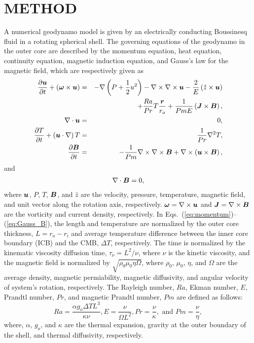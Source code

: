 \section{METHOD}

A numerical geodynamo model is given by an electrically conducting Boussinesq fluid in a rotating spherical shell. The governing equations of the geodynamo in the outer core are described by the momentum equation, heat equation, continuity equation, magnetic induction equation, and Gauss's law for the magnetic field, which are respectively given as
%
\begin{eqnarray}
\frac{\partial \bvec{u}}{\partial t} + \left(\bvec{\omega} \times \bvec{u}\right)
 & = & - \nabla \left(P+\frac{1}{2}u^{2} \right) - \nabla \times \nabla \times \bvec{u}
      - \frac{2}{E} \left(\hat{z} \times \bvec{u} \right)
\nonumber \\
 & & + \frac{Ra}{Pr} T \frac{\bvec{r}}{r_{o}}
        + \frac{1}{Pm E} \left(\bvec{J} \times \bvec{B} \right),
\label{eq:momentum} \\
%
\nabla \cdot \bvec{u} & = & 0, 
\label{eq:conservation} \\
%
\frac{\partial T}{\partial t} + \left(\bvec{u} \cdot \nabla \right) T
 & = & \frac{1}{Pr} \nabla^{2} T,
\label{eq:heat} \\
%
 \frac{\partial \bvec{B}}{\partial t}
 & = & -\frac{1}{Pm}  \nabla \times \nabla \times \bvec{B}
       + \nabla \times \left(\bvec{u} \times \bvec{B} \right),
\label{eq:induction}
\end{eqnarray}
%
and
\begin{eqnarray}
\nabla \cdot \mbox{\boldmath$B$} = 0,
\label{eq:Gauss_B}
\end{eqnarray}
%
where $\mbox{\boldmath$u$}$, $P$, $T$, $\mbox{\boldmath$B$}$, and $\hat{z}$ are the velocity, pressure, temperature, magnetic field, and unit vector along the rotation axis, respectively. 
$\mbox{\boldmath$\omega$} = \nabla \times \mbox{\boldmath$u$}$ and $\mbox{\boldmath$J$} = \nabla \times \mbox{\boldmath$B$}$ are the vorticity and current density, respectively.
In Eqs.~(\ref{eq:momentum})--(\ref{eq:Gauss_B}), the length and temperature are normalized by the outer core thickness, $L = r_{o} - r_{i}$ and average temperature difference between the inner core boundary (ICB) and the CMB, $\Delta T$, respectively. 
The time is normalized by the kinematic viscosity diffusion time, $\tau_{\nu}  = L^{2} / \nu$, where $\nu$ is the kinetic viscosity, and the magnetic field is normalized by $\sqrt{\rho_{0} \mu_{0} \eta \Omega}$, where $\rho_{0}$, $\mu_{0}$, $\eta$, and $\Omega$ are the average density, magnetic permiability, magnetic diffusivity, and angular velocity of system's rotation, respectively.
The Rayleigh number, $Ra$, Ekman number, $E$, Prandtl number, $Pr$, and magnetic Prandtl number,  $Pm$ are defined as follows:
%
\begin{equation}
Ra = \displaystyle{ \frac{\alpha g_o \Delta T L^{3}}{ \kappa \nu} }, 
E  = \displaystyle{ \frac{\nu}{\Omega L^{2}} },
Pr = \displaystyle{ \frac{\nu}{\kappa} }, 
\mbox{ and }
Pm = \displaystyle{ \frac{\nu}{\eta} },
\label{eq:dimensionless}
\end{equation}
%
where, $\alpha$, $g_o$, and $\kappa$ are the thermal expansion, gravity at the outer boundary of the shell, and thermal diffusivity, respectively.

